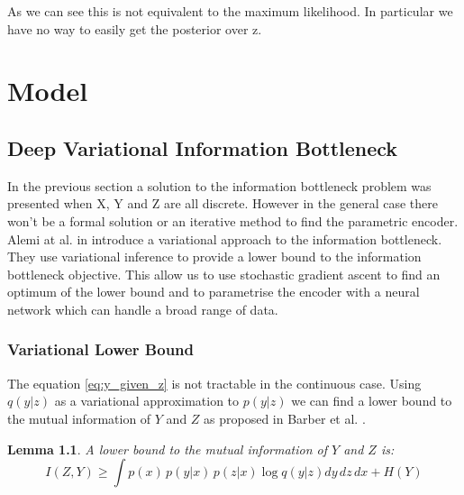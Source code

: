 \documentclass[10pt,oneside,openright]{report}
\newtheorem{lemma}{Lemma}
\begin{document}
As we can see this is not equivalent to the maximum likelihood. In particular we have no way to easily get the posterior over z.

\chapter{Model}
\section{Deep Variational Information Bottleneck}

In the previous section a solution to the information bottleneck problem was presented when X, Y and Z are all discrete. However in the general case there won't be a formal solution or an iterative method to find the parametric encoder. Alemi at al. in \cite{vib} introduce a variational approach to the information bottleneck. They use variational inference to provide a lower bound to the information bottleneck objective. This allow us to use stochastic gradient ascent to find an optimum of the lower bound and to parametrise the encoder with a neural network which can handle a broad range of data.

\subsection{Variational Lower Bound}

The equation \ref{eq:y_given_z} is not tractable in the continuous case. Using $q(y|z)$ as a variational approximation to $p(y|z)$ we can find a lower bound to the mutual information of $Y$ and $Z$ as proposed in Barber et al. \cite{barber}.

\begin{lemma}
A lower bound to the mutual information of $Y$ and $Z$ is:
$$ I(Z, Y) \geq  \int p(x)\, p(y|x)\, p(z|x) \log q(y|z) dy\, dz\, dx + H(Y)$$
\end{lemma}
\end{document}
